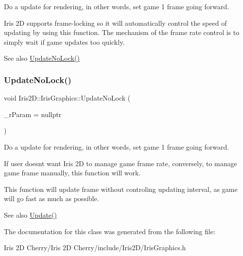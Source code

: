 Do a update for rendering, in other words, set game 1 frame going forward. 

Iris 2D supports frame-\/locking so it will automatically control the speed of updating by using this function. The mechanism of the frame rate control is to simply wait if game updates too quickly. \begin{DoxySeeAlso}{See also}
\hyperlink{class_iris2_d_1_1_iris_graphics_adbbca919748bfdd9b84958414debc588}{Update\+No\+Lock()} 
\end{DoxySeeAlso}
\mbox{\label{class_iris2_d_1_1_iris_graphics_adbbca919748bfdd9b84958414debc588}} 
\subsubsection{\texorpdfstring{Update\+No\+Lock()}{UpdateNoLock()}}
{\footnotesize\ttfamily void Iris2\+D\+::\+Iris\+Graphics\+::\+Update\+No\+Lock (\begin{DoxyParamCaption}\item[{Iris\+Result $\ast$}]{\+\_\+r\+Param = {\ttfamily nullptr} }\end{DoxyParamCaption})}



Do a update for rendering, in other words, set game 1 frame going forward. 

If user doesn\textquotesingle{}t want Iris 2D to manage game frame rate, conversely, to manage game frame manually, this function will work.

This function will update frame without controling updating interval, as game will go fast as much as possible. \begin{DoxySeeAlso}{See also}
\hyperlink{class_iris2_d_1_1_iris_graphics_aa25debfc9a08d7084f48711a6bffdc4d}{Update()} 
\end{DoxySeeAlso}


The documentation for this class was generated from the following file\+:\begin{DoxyCompactItemize}
\item 
Iris 2\+D Cherry/\+Iris 2\+D Cherry/include/\+Iris2\+D/Iris\+Graphics.\+h\end{DoxyCompactItemize}
